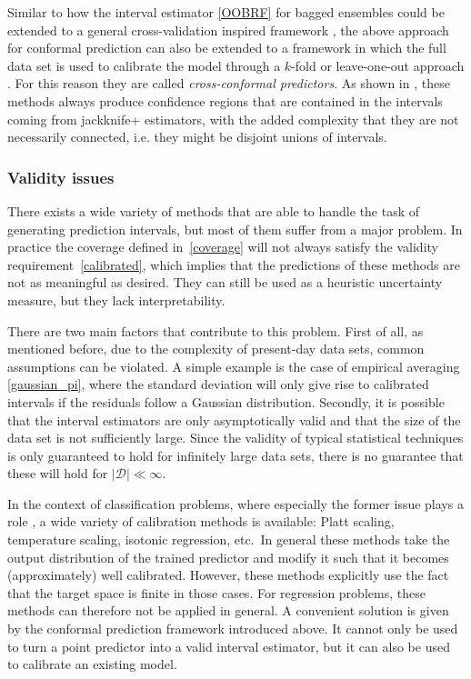 \documentclass[smallcondensed]{svjour3}
\begin{document}
    Similar to how the interval estimator \eqref{OOBRF} for bagged ensembles could be extended to a general cross-validation inspired framework \cite{barber2021predictive}, the above approach for conformal prediction can also be extended to a framework in which the full data set is used to calibrate the model through a $k$-fold or leave-one-out approach \cite{vovk2015cross}. For this reason they are called \textit{cross-conformal predictors}. As shown in \cite{barber2021predictive}, these methods always produce confidence regions that are contained in the intervals coming from jackknife+ estimators, with the added complexity that they are not necessarily connected, i.e. they might be disjoint unions of intervals.

\subsubsection*{Validity issues}\label{section:calibration}

    There exists a wide variety of methods that are able to handle the task of generating prediction intervals, but most of them suffer from a major problem. In practice the coverage defined in~\eqref{coverage} will not always satisfy the validity requirement~\eqref{calibrated}, which implies that the predictions of these methods are not as meaningful as desired. They can still be used as a heuristic uncertainty measure, but they lack interpretability.

    There are two main factors that contribute to this problem. First of all, as mentioned before, due to the complexity of present-day data sets, common assumptions can be violated. A simple example is the case of empirical averaging \eqref{gaussian_pi}, where the standard deviation will only give rise to calibrated intervals if the residuals follow a Gaussian distribution. Secondly, it is possible that the interval estimators are only asymptotically valid and that the size of the data set is not sufficiently large. Since the validity of typical statistical techniques is only guaranteed to hold for infinitely large data sets, there is no guarantee that these will hold for $|\mathcal{D}|\ll\infty$.

    In the context of classification problems, where especially the former issue plays a role \cite{guo2017calibration}, a wide variety of calibration methods is available: Platt scaling, temperature scaling, isotonic regression, etc.\ In general these methods take the output distribution of the trained predictor and modify it such that it becomes (approximately) well calibrated. However, these methods explicitly use the fact that the target space is finite in those cases. For regression problems, these methods can therefore not be applied in general. A convenient solution is given by the conformal prediction framework introduced above. It cannot only be used to turn a point predictor into a valid interval estimator, but it can also be used to calibrate an existing model.
\end{document}
